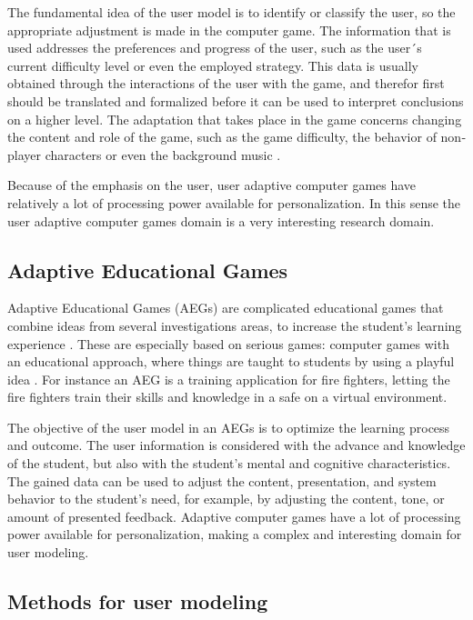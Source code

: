 The fundamental idea of the user model is to identify or classify the user, so
the appropriate adjustment is made in the computer game. The information that is
used addresses the preferences and progress of the user, such as the user´s
current difficulty level or even the employed strategy. This data is usually
obtained through the interactions of the user with the game, and therefor first
should be translated and formalized before it can be used to interpret
conclusions on a higher level. The adaptation that takes place in the game
concerns changing the content and role of the game, such as the game
difficulty, the behavior of non‐player characters or even the background music
\cite{bakkes2012personalised}.

Because of the emphasis on the user, user adaptive computer games have
relatively a lot of processing power available for personalization. In this
sense the user adaptive computer games domain is a very interesting research
domain.

\subsection{Adaptive Educational Games}

Adaptive Educational Games (AEGs) are complicated educational games that combine
ideas from several investigations areas, to increase the student’s learning
experience \cite{peeters2012situated}. These are especially based on serious
games: computer games with an educational approach, where things are taught to
students by using a playful idea \cite{korteling2011transfer} \cite{johnson2005serious}.
For instance an AEG is a training application for fire fighters, letting
the fire fighters train their skills and knowledge in a safe on a virtual
environment.

The objective of the user model in an AEGs is to optimize the learning process
and outcome. The user information is considered with the advance and knowledge
of the student, but also with the student’s mental and cognitive
characteristics. The gained data can be used to adjust the content,
presentation, and system behavior to the student’s need, for example, by
adjusting the content, tone, or amount of presented feedback. Adaptive computer
games have a lot of processing power available for personalization, making a
complex and interesting domain for user modeling.

\subsection{Methods for user modeling}

